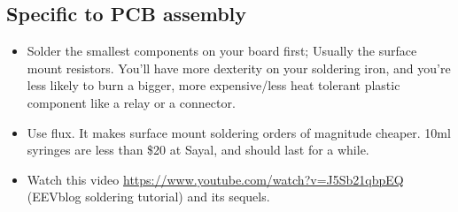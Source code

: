 \documentclass{article}
\begin{document}
\subsection{Specific to PCB assembly}
\begin{itemize}
\item Solder the smallest components on your board first; Usually the surface mount resistors. You'll have more dexterity on your soldering iron, and you're less likely to burn a bigger, more expensive/less heat tolerant plastic component like a relay or a connector.
\item Use flux. It makes surface mount soldering orders of magnitude cheaper. 10ml syringes are less than \$20 at Sayal, and should last for a while.
\item Watch this video \url{https://www.youtube.com/watch?v=J5Sb21qbpEQ} (EEVblog soldering tutorial) and its sequels.
\end{itemize}

\end{document}
